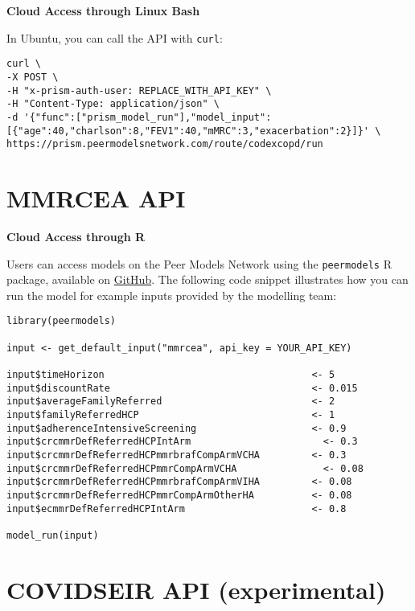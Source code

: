 \documentclass[
]{book}
\begin{document}
\textbf{Cloud Access through Linux Bash}

In Ubuntu, you can call the API with \texttt{curl}:

\begin{verbatim}
curl \
-X POST \
-H "x-prism-auth-user: REPLACE_WITH_API_KEY" \
-H "Content-Type: application/json" \
-d '{"func":["prism_model_run"],"model_input":[{"age":40,"charlson":8,"FEV1":40,"mMRC":3,"exacerbation":2}]}' \
https://prism.peermodelsnetwork.com/route/codexcopd/run
\end{verbatim}

\hypertarget{mmrcea-api}{%
\section{MMRCEA API}\label{mmrcea-api}}

\textbf{Cloud Access through R}

Users can access models on the Peer Models Network using the \texttt{peermodels} R package, available on \href{https://github.com/resplab/peermodels}{GitHub}. The following code snippet illustrates how you can run the model for example inputs provided by the modelling team:

\begin{verbatim}
library(peermodels)

input <- get_default_input("mmrcea", api_key = YOUR_API_KEY)

input$timeHorizon                                    <- 5
input$discountRate                                   <- 0.015
input$averageFamilyReferred                          <- 2       
input$familyReferredHCP                              <- 1     
input$adherenceIntensiveScreening                    <- 0.9      
input$crcmmrDefReferredHCPIntArm                       <- 0.3   
input$crcmmrDefReferredHCPmmrbrafCompArmVCHA         <- 0.3   
input$crcmmrDefReferredHCPmmrCompArmVCHA               <- 0.08  
input$crcmmrDefReferredHCPmmrbrafCompArmVIHA         <- 0.08  
input$crcmmrDefReferredHCPmmrCompArmOtherHA          <- 0.08  
input$ecmmrDefReferredHCPIntArm                      <- 0.8   

model_run(input)
\end{verbatim}

\hypertarget{covidseir-api-experimental}{%
\section{COVIDSEIR API (experimental)}\label{covidseir-api-experimental}}
\end{document}
